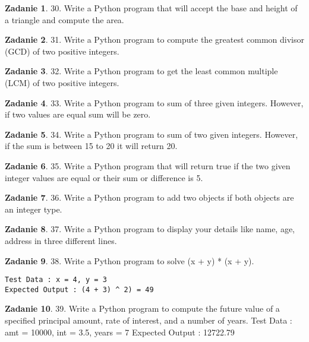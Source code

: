 \documentclass[11pt]{article}
\theoremstyle{definition}
\newtheorem{zadanie}{Zadanie}
\begin{document}
\begin{zadanie}
30. Write a Python program that will accept the base and height of a triangle and compute the area.
\end{zadanie}

\begin{zadanie}
31. Write a Python program to compute the greatest common divisor (GCD) of two positive integers.
\end{zadanie}

\begin{zadanie}
32. Write a Python program to get the least common multiple (LCM) of two positive integers.
\end{zadanie}

\begin{zadanie}
33. Write a Python program to sum of three given integers. However, if two values are equal sum will be zero.
\end{zadanie}

\begin{zadanie}
34. Write a Python program to sum of two given integers. However, if the sum is between 15 to 20 it will return 20.
\end{zadanie}

\begin{zadanie}
35. Write a Python program that will return true if the two given integer values are equal or their sum or difference is 5.
\end{zadanie}

\begin{zadanie}
36. Write a Python program to add two objects if both objects are an integer type.
\end{zadanie}

\begin{zadanie}
37. Write a Python program to display your details like name, age, address in three different lines.
\end{zadanie}

\begin{zadanie}
38. Write a Python program to solve (x + y) * (x + y).
\begin{verbatim}
Test Data : x = 4, y = 3
Expected Output : (4 + 3) ^ 2) = 49
\end{verbatim}
\end{zadanie}

\begin{zadanie}
39. Write a Python program to compute the future value of a specified principal amount, rate of interest, and a number of years.
Test Data : amt = 10000, int = 3.5, years = 7
Expected Output : 12722.79
\end{zadanie}
\end{document}
